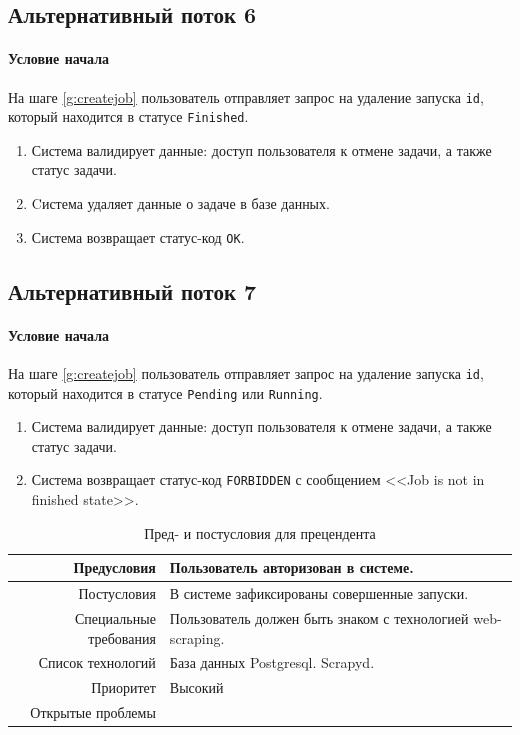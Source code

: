 \documentclass[a4paper,12pt]{article}
\begin{document}
\subsection*{Альтернативный поток 6} 
\paragraph*{Условие начала} На шаге \ref{g:createjob} пользователь отправляет запрос на удаление запуска \texttt{id}, который находится в статусе \texttt{Finished}.

\begin{enumerate}
    \item Система валидирует данные: доступ пользователя к отмене задачи, а также статус задачи.
    \item Cистема удаляет данные о задаче в базе данных.
    \item Система возвращает статус-код \texttt{OK}.
\end{enumerate}

\subsection*{Альтернативный поток 7} 
\paragraph*{Условие начала} На шаге \ref{g:createjob} пользователь отправляет запрос на удаление запуска \texttt{id}, который находится в статусе \texttt{Pending} или \texttt{Running}.

\begin{enumerate}
    \item Система валидирует данные: доступ пользователя к отмене задачи, а также статус задачи.
    \item Система возвращает статус-код \texttt{FORBIDDEN} с сообщением <<Job is not in finished state>>.
\end{enumerate}


\begin{longtable}[]{|@{\textbf}r|p{7cm}|} 
\caption{Пред- и постусловия для прецендента}
\hline
    Предусловия            &  Пользователь авторизован в системе. \\ \hline
    Постусловия            & В системе зафиксированы совершенные запуски.              \\ \hline
    Специальные требования & Пользователь должен быть знаком с технологией web-scraping. \\ \hline
    Список технологий      & База данных Postgresql. Scrapyd. \\ \hline
    Приоритет              & Высокий \\ \hline
    Открытые проблемы      &            \\ \hline
\end{longtable}
\end{document}

